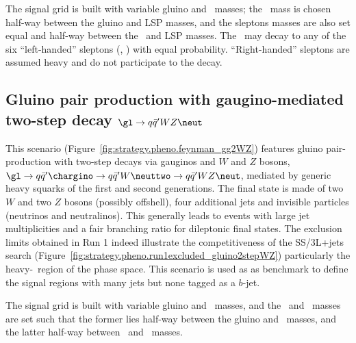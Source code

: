 The signal grid is built with variable gluino and \neut\ masses; the \neuttwo\ mass is chosen half-way between the gluino and LSP masses, 
and the sleptons masses are also set equal and half-way between the \neuttwo\ and LSP masses. 
The \neuttwo\ may decay to any of the six ``left-handed'' sleptons (\slep, \snu) with equal probability. 
``Right-handed'' sleptons are assumed heavy and do not participate to the decay. 


\subsection*{Gluino pair production with gaugino-mediated two-step decay $\gl\to q\bar q'WZ\neut$}
\label{subsec:signals_g2wz}

This scenario (Figure~\ref{fig:strategy.pheno.feynman_gg2WZ}) features gluino pair-production with two-step decays via gauginos and $W$ and $Z$ bosons, 
$\gl\to q\bar{q}'\chargino\to q\bar{q}'W\neuttwo\to q\bar{q}'WZ\neut$, 
mediated by generic heavy squarks of the first and second generations. 
The final state is made of two $W$ and two $Z$ bosons (possibly offshell), 
four additional jets and invisible particles (neutrinos and neutralinos). 
This generally leads to events with large jet multiplicities and a fair branching ratio for dileptonic final states. 
The exclusion limits obtained in Run 1 indeed illustrate the competitiveness of the SS/3L+jets search (Figure~\ref{fig:strategy.pheno.run1excluded_gluino2stepWZ})
particularly the heavy-\neut\ region of the phase space. 
This scenario is used as as benchmark to define the signal regions with many jets but none tagged as a $b$-jet. 

The signal grid is built with variable gluino and \neut\ masses, 
and the \chargino\ and \neuttwo\ masses are set such that the former lies half-way between the gluino and \neut\ masses, 
and the latter half-way between \chargino\ and \neut\ masses. 

